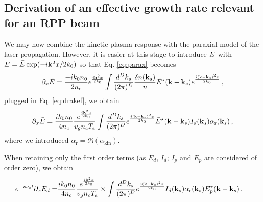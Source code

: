 \documentclass[
 reprint,
 amsmath,amssymb,
 aps,
]{revtex4-1}
\begin{document}
\subsection{Derivation of an effective growth rate relevant for an  RPP beam}
 \begin{widetext}
We may now combine the kinetic plasma response  with the paraxial model of  the laser propagation. 
However, it  is easier at this stage to introduce $\Bar{E}$ with  $E=\Bar{E}\exp(-i \mathbf{k}^2x /2k_0)$ so that Eq. \eqref{eq:parax} becomes
\begin{equation}
    \partial_x \Bar{E}  =\frac{-ik_0n_0}{2n_c} e^{\frac{i\mathbf{k}^2x }{2k_0}}\int \frac{d^Dk_s}{(2\pi)^D} \frac{\delta n(\mathbf{k}_s)}{n} \Bar{E}^\star(\mathbf{k}-\mathbf{k}_s) e^{ \frac{i(\mathbf{k}-\mathbf{k}_s)^2x}{2k_0}}\, ,  \label{eq:paraxbar}
\end{equation}
 plugged in Eq. \eqref{eq:drakef}, we obtain
\begin{align}
    \partial_x \Bar{E}  =\frac{ik_0n_0}{4n_c} \frac{e^{\frac{i\mathbf{k}^2 x}{2k_0}}}{  v_g n_c T_e}
    \int \frac{d^Dk_s}{(2\pi)^D}  e^{ \frac{i(\mathbf{k}-\mathbf{k}_s)^2x}{2k_0}} \Bar{E}^\star(\mathbf{k}-\mathbf{k}_s) 
   I_d(\mathbf{k}_s) \alpha_\mathrm{r}   (\mathbf{k}_s) 
   \, ,  \label{eq:paraxbar}
\end{align}
where we introduced $\alpha_\mathrm{r}=\Re(\alpha_\mathrm{kin} )$. 

 When retaining only the first order terms (as $E_d$, $I_d$; $I_p$ and $E_p$ are considered of order zero), we obtain 
 \begin{align}
   e^{-i\omega_s t}\partial_x \Bar{E}_d  =&\frac{ik_0n_0}{4n_c} \frac{e^{\frac{i\mathbf{k}^2 x}{2k_0}}}{  v_g n_c T_e} \times 
   \int \frac{d^Dk_s}{(2\pi)^D} 
   e^{ \frac{i(\mathbf{k}-\mathbf{k}_s)^2x}{2k_0}}
   I_d(\mathbf{k}_s) \alpha_\mathrm{r}   (\mathbf{k}_s) \Bar{E}_p^\star(\mathbf{k}-\mathbf{k}_s) %
   \, .  \label{eq:paraxbar}
\end{align}


\end{widetext}
\end{document}
